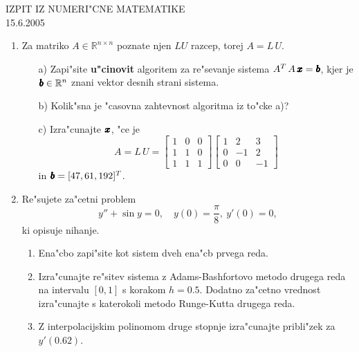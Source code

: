 \documentclass[12pt,a4paper]{article}
\def\RR{\mathbb{R}}
\def\bfm#1{{\dimen0=.01em\dimen1=.009em\makebold{$#1$}}}
\def\makebold#1{\mathord{\setbox0=\hbox{#1}%
       \copy0\kern-\wd0%
       \raise\dimen1\copy0\kern-\wd0%
       {\advance\dimen1 by \dimen1\raise\dimen1\copy0}\kern-\wd0%
       \kern\dimen0\raise\dimen1\copy0\kern-\wd0%
       {\advance\dimen1 by \dimen1\raise\dimen1\copy0}\kern-\wd0%
       \kern\dimen0\raise\dimen1\copy0\kern-\wd0%
       {\advance\dimen1 by \dimen1\raise\dimen1\copy0}\kern-\wd0%
       \kern\dimen0\raise\dimen1\copy0\kern-\wd0%
       \kern\dimen0\box0}}
\begin{document}
\begin{center}
  {\large IZPIT IZ NUMERI"CNE MATEMATIKE\\
    15.6.2005}
\end{center}
\vspace{1.5cm}
\begin{enumerate}
\item Za matriko $A\in\RR^{n\times n}$ poznate njen $LU$ razcep,
        torej $A=L\,U$.
        \begin{itemize}
          \item[a)] Zapi"site {\bf u"cinovit} algoritem za 
            re"sevanje sistema $A^T\,A\,\bfm{x}=\bfm{b}$, kjer
            je $\bfm{b}\in\RR^n$ znani vektor desnih strani sistema.
          \item[b)] Kolik"sna je "casovna zahtevnost algoritma 
            iz to"cke a)?
          \item[c)] Izra"cunajte $\bfm{x}$, "ce je
            $$
              A=L\,U=
              \left[
                \begin{array}{ccc}
                  1 & 0 & 0\\
                  1 & 1 & 0\\
                  1 & 1 & 1
                \end{array}
               \right]
               \left[
                \begin{array}{ccc}
                  1 & 2 & 3\\
                  0 & -1 & 2\\
                  0 & 0 & -1
                \end{array}
               \right]
            $$
            in $\bfm{b}=[47,61,192]^T$.
                  \end{itemize}
        
      \item Re"sujete za"cetni problem
        $$y''+\sin{y}=0,\quad y(0)=\frac{\pi}{8},\ y'(0)=0,$$
        ki opisuje nihanje. 
        \begin{enumerate}
        \item Ena"cbo zapi"site kot sistem dveh ena"cb prvega reda.
        \item Izra"cunajte re"sitev sistema z Adams-Bashfortovo  
          metodo drugega reda na intervalu $[0,1]$ s korakom
          $h=0.5$. Dodatno za"cetno vrednost izra"cunajte
          s katerokoli metodo Runge-Kutta drugega reda.
        \item Z interpolacijskim polinomom druge stopnje 
          izra"cunajte pribli"zek za $y'(0.62)$.
        \end{enumerate}
      \end{enumerate}
\end{document}
